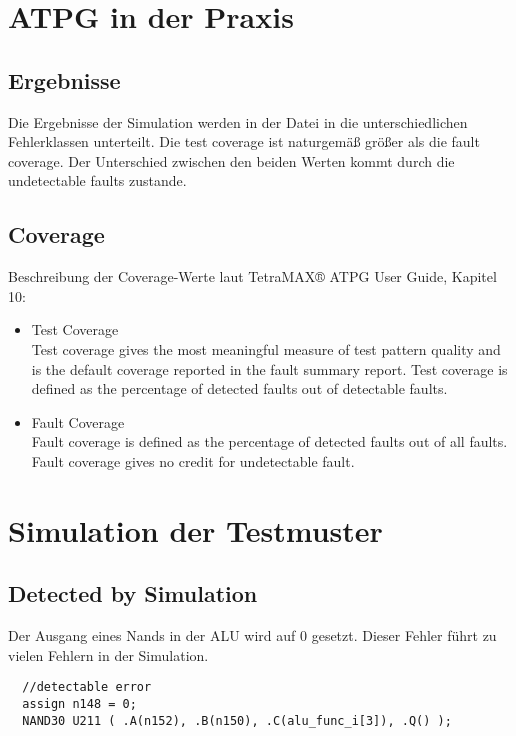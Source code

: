 \documentclass[12pt,a4paper]{article}
\begin{document}
\section{ATPG in der Praxis}

\subsection{Ergebnisse}
Die Ergebnisse der Simulation werden in der Datei in die unterschiedlichen Fehlerklassen unterteilt. Die test coverage ist naturgemäß größer als die fault coverage. Der Unterschied zwischen den beiden Werten kommt durch die undetectable faults zustande.


\subsection{Coverage}
Beschreibung der Coverage-Werte laut TetraMAX® ATPG User Guide, Kapitel 10:
\begin{itemize}

\item Test Coverage\\
Test coverage gives the most meaningful measure of test pattern quality and is the default
coverage reported in the fault summary report. Test coverage is defined as the percentage
of detected faults out of detectable faults.

\item Fault Coverage\\
Fault coverage is defined as the percentage of detected faults out of all faults.
Fault coverage gives no credit for undetectable fault.

\end{itemize}

\newpage
\section{Simulation der Testmuster}

\subsection{Detected by Simulation}
Der Ausgang eines Nands in der ALU wird auf 0 gesetzt. Dieser Fehler führt zu vielen Fehlern in der Simulation.

\begin{lstlisting}
  //detectable error
  assign n148 = 0;
  NAND30 U211 ( .A(n152), .B(n150), .C(alu_func_i[3]), .Q() );
\end{lstlisting}
\end{document}
